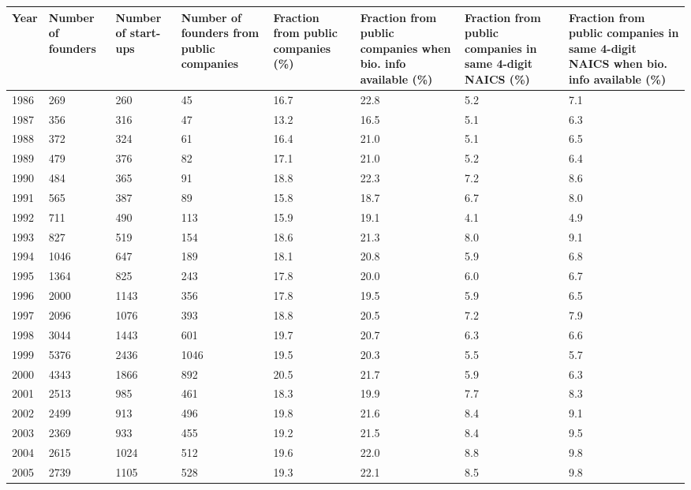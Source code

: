 \begin{table}[!htb]
\centering
\begingroup\scriptsize
\begin{tabular}{p{1.75cm}p{1.75cm}p{1.75cm}p{1.75cm}p{1.75cm}p{1.75cm}p{1.75cm}p{1.75cm}}
  \toprule
Year & Number of founders & Number of start-ups & Number of founders from public companies & Fraction from public companies (\%) & Fraction from public companies when bio. info available (\%) & Fraction from public companies in same 4-digit NAICS (\%) & Fraction from public companies in same 4-digit NAICS when bio. info available (\%) \\ 
  \midrule
1986 & 269 & 260 & 45 & 16.7 & 22.8 & 5.2 & 7.1 \\ 
  1987 & 356 & 316 & 47 & 13.2 & 16.5 & 5.1 & 6.3 \\ 
  1988 & 372 & 324 & 61 & 16.4 & 21.0 & 5.1 & 6.5 \\ 
  1989 & 479 & 376 & 82 & 17.1 & 21.0 & 5.2 & 6.4 \\ 
  1990 & 484 & 365 & 91 & 18.8 & 22.3 & 7.2 & 8.6 \\ 
  1991 & 565 & 387 & 89 & 15.8 & 18.7 & 6.7 & 8.0 \\ 
  1992 & 711 & 490 & 113 & 15.9 & 19.1 & 4.1 & 4.9 \\ 
  1993 & 827 & 519 & 154 & 18.6 & 21.3 & 8.0 & 9.1 \\ 
  1994 & 1046 & 647 & 189 & 18.1 & 20.8 & 5.9 & 6.8 \\ 
  1995 & 1364 & 825 & 243 & 17.8 & 20.0 & 6.0 & 6.7 \\ 
  1996 & 2000 & 1143 & 356 & 17.8 & 19.5 & 5.9 & 6.5 \\ 
  1997 & 2096 & 1076 & 393 & 18.8 & 20.5 & 7.2 & 7.9 \\ 
  1998 & 3044 & 1443 & 601 & 19.7 & 20.7 & 6.3 & 6.6 \\ 
  1999 & 5376 & 2436 & 1046 & 19.5 & 20.3 & 5.5 & 5.7 \\ 
  2000 & 4343 & 1866 & 892 & 20.5 & 21.7 & 5.9 & 6.3 \\ 
  2001 & 2513 & 985 & 461 & 18.3 & 19.9 & 7.7 & 8.3 \\ 
  2002 & 2499 & 913 & 496 & 19.8 & 21.6 & 8.4 & 9.1 \\ 
  2003 & 2369 & 933 & 455 & 19.2 & 21.5 & 8.4 & 9.5 \\ 
  2004 & 2615 & 1024 & 512 & 19.6 & 22.0 & 8.8 & 9.8 \\ 
  2005 & 2739 & 1105 & 528 & 19.3 & 22.1 & 8.5 & 9.8 \\ 

\end{tabular}
\end{table}
